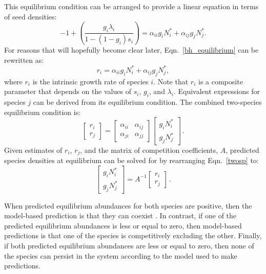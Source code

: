 This equilibrium condition can be arranged to provide a linear equation in terms of seed densities:
\begin{equation}
\label{bh_equilibrium}
    -1 + \left( \frac{g_{i}\lambda_{i}}{1-(1-g_{i})s_{i}} \right) = \alpha_{ii}g_{i}N_{i}^{*} + \alpha_{ij}g_{j}N_{j}^{*}.
\end{equation}
For reasons that will hopefully become clear later, Eqn.~\ref{bh_equilibrium} can be rewritten as:
\begin{equation}
  \label{growth_competition}
  r_{i} = \alpha_{ii}g_{i}N_{i}^{*} + \alpha_{ij}g_{j}N_{j}^{*},
\end{equation}
where $r_{i}$ is the intrinsic growth rate of  species $i$. Note that $r_{i}$ is a composite parameter that depends on the values of $s_{i}$, $g_{i}$, and $\lambda_{i}$. Equivalent expressions for species $j$ can be derived from its equilibrium condition. The combined two-species equilibrium condition is:
\begin{equation}
\begin{bmatrix}
r_{i} \\
r_{j}
\end{bmatrix} =
\begin{bmatrix}
\alpha_{ii} &  \alpha_{ij} \\
\alpha_{ji} & \alpha_{jj}
\end{bmatrix}
\begin{bmatrix}
g_{i}N_{i}^{*}\\ g_{j}N_{j}^{*}
\end{bmatrix} \,.
\label{twosp}
\end{equation}
Given estimates of $r_{i}$, $r_{j}$, and the matrix of competition coefficients, $A$, predicted species densities at equilibrium can be solved for by rearranging Eqn.~\ref{twosp} to:
\begin{equation}
\begin{bmatrix}
g_{i}N_{i}^{*}\\
g_{j}N_{j}^{*}
\end{bmatrix} =
A^{-1}
\begin{bmatrix}
r_{i}\\ r_{j}
\end{bmatrix} \,.
\label{abundances}
\end{equation}

When predicted equilibrium abundances for both species are positive, then the model-based prediction is that they can coexist \citep{rohr_structural_2014,saavedra2017structural}. In contrast, if one of the predicted equilibrium abundances is less or equal to zero, then model-based predictions is that one of the species is competitively excluding the other. Finally, if both predicted equilibrium abundances are less or equal to zero, then none of the species can persist in the system according to the model used to make predictions.


